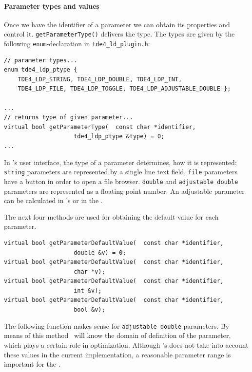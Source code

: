 \documentclass[10pt,a4paper]{article}
\begin{document}
\paragraph{Parameter types and values}
Once we have the identifier of a parameter
we can obtain its properties and control it. {\tt getParameterType()} delivers the type.
The types are given by the following {\tt enum}-declaration in {\tt tde4\_ld\_plugin.h}:
\begin{lstlisting}[language=mycpp,tabsize=8]
// parameter types...
enum tde4_ldp_ptype {
	TDE4_LDP_STRING, TDE4_LDP_DOUBLE, TDE4_LDP_INT,
	TDE4_LDP_FILE, TDE4_LDP_TOGGLE, TDE4_LDP_ADJUSTABLE_DOUBLE };

...
// returns type of given parameter...
virtual bool getParameterType(	const char *identifier,
					tde4_ldp_ptype &type) = 0;
...
\end{lstlisting}
In \tde's user interface, the type of a parameter determines, how it is represented; {\tt string}
parameters are represented by a single line text field, {\tt file} parameters have a button
in order to open a file browser. {\tt double} and {\tt adjustable double} parameters are represented
as a floating point number. An adjustable parameter can be calculated
in \tde's  or in the .



The next four methods are used for obtaining the default value for each parameter.
\begin{lstlisting}[language=mycpp,tabsize=8]
virtual bool getParameterDefaultValue(	const char *identifier,
					double &v) = 0;
virtual bool getParameterDefaultValue(	const char *identifier,
					char *v);
virtual bool getParameterDefaultValue(	const char *identifier,
					int &v);
virtual bool getParameterDefaultValue(	const char *identifier,
					bool &v);
\end{lstlisting}
The following function makes sense for {\tt adjustable double} parameters. By means
of this method \tde\ will know the domain of definition of the parameter, which
plays a certain role in optimization. Although \tde's 
does not take into account these values in the current implementation,
a reasonable parameter range is important for the .
\end{document}
